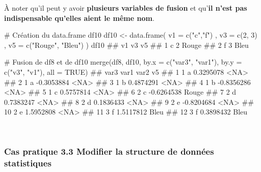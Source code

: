 \documentclass[12pt,twosided, notitlepage]{book}
\newenvironment{Shaded}{}{}
\newcommand{\CommentTok}[1]{\textcolor[rgb]{0.00,0.50,0.00}{#1}}
\newcommand{\DataTypeTok}[1]{#1}
\newcommand{\DecValTok}[1]{#1}
\newcommand{\KeywordTok}[1]{\textcolor[rgb]{0.00,0.00,1.00}{#1}}
\newcommand{\NormalTok}[1]{#1}
\newcommand{\OtherTok}[1]{\textcolor[rgb]{1.00,0.25,0.00}{#1}}
\newcommand{\StringTok}[1]{\textcolor[rgb]{0.00,0.50,0.50}{#1}}
\renewenvironment{Shaded}{\begin{snugshade}}{\end{snugshade}}
\begin{document}
À noter qu'il peut y avoir \textbf{plusieurs variables de fusion} et
qu'\textbf{il n'est pas indispensable qu'elles aient le même nom}.

\begin{Shaded}
\begin{Highlighting}[]
\CommentTok{# Création du data.frame df10}
\NormalTok{df10 <-}\StringTok{ }\KeywordTok{data.frame}\NormalTok{(}
  \DataTypeTok{v1 =} \KeywordTok{c}\NormalTok{(}\StringTok{"c"}\NormalTok{,}\StringTok{"f"}\NormalTok{)}
\NormalTok{  , }\DataTypeTok{v3 =} \KeywordTok{c}\NormalTok{(}\DecValTok{2}\NormalTok{, }\DecValTok{3}\NormalTok{)}
\NormalTok{  , }\DataTypeTok{v5 =} \KeywordTok{c}\NormalTok{(}\StringTok{"Rouge"}\NormalTok{, }\StringTok{"Bleu"}\NormalTok{)}
\NormalTok{)}
\NormalTok{df10}
\NormalTok{  ##   v1 v3    v5}
\NormalTok{  ## 1  c  2 Rouge}
\NormalTok{  ## 2  f  3  Bleu}

\CommentTok{# Fusion de df8 et de df10}
\KeywordTok{merge}\NormalTok{(df8, df10, }\DataTypeTok{by.x =} \KeywordTok{c}\NormalTok{(}\StringTok{"var3"}\NormalTok{, }\StringTok{"var1"}\NormalTok{), }\DataTypeTok{by.y =} \KeywordTok{c}\NormalTok{(}\StringTok{"v3"}\NormalTok{, }\StringTok{"v1"}\NormalTok{), }\DataTypeTok{all =} \OtherTok{TRUE}\NormalTok{)}
\NormalTok{  ##    var3 var1       var2    v5}
\NormalTok{  ## 1     1    a  0.3295078  <NA>}
\NormalTok{  ## 2     1    a -0.3053884  <NA>}
\NormalTok{  ## 3     1    b  0.4874291  <NA>}
\NormalTok{  ## 4     1    b -0.8356286  <NA>}
\NormalTok{  ## 5     1    c  0.5757814  <NA>}
\NormalTok{  ## 6     2    c -0.6264538 Rouge}
\NormalTok{  ## 7     2    d  0.7383247  <NA>}
\NormalTok{  ## 8     2    d  0.1836433  <NA>}
\NormalTok{  ## 9     2    e -0.8204684  <NA>}
\NormalTok{  ## 10    2    e  1.5952808  <NA>}
\NormalTok{  ## 11    3    f  1.5117812  Bleu}
\NormalTok{  ## 12    3    f  0.3898432  Bleu}
\end{Highlighting}
\end{Shaded}

~

\hypertarget{cas-pratique-3.3-modifier-la-structure-de-donnees-statistiques}{%
\subsubsection{\texorpdfstring{\textbf{Cas pratique 3.3} Modifier la
structure de données
statistiques}{Cas pratique 3.3 Modifier la structure de données statistiques}}\label{cas-pratique-3.3-modifier-la-structure-de-donnees-statistiques}}
\end{document}
